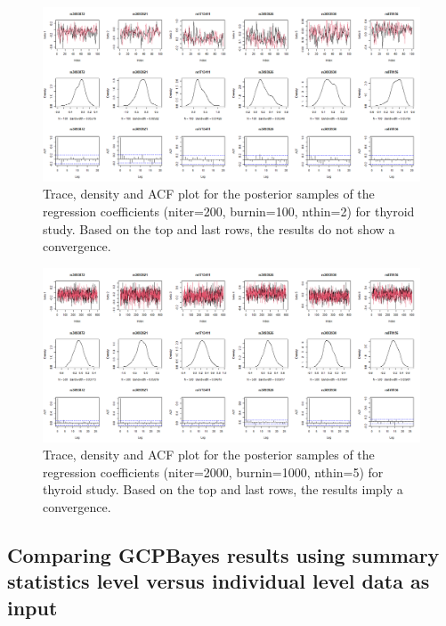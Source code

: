 \begin{figure}
\includegraphics[width=1\linewidth,height=0.3\textheight]{p1} \caption{Trace, density and ACF plot  for the posterior samples of the regression coefficients (niter=200, burnin=100, nthin=2) for thyroid study. Based on the top and last rows, the results do not show a convergence.}\label{fig:unnamed-chunk-23}
\end{figure}

\begin{figure}
\includegraphics[width=1\linewidth,height=0.3\textheight]{p2} \caption{Trace, density and ACF plot  for the posterior samples of the regression coefficients (niter=2000, burnin=1000, nthin=5) for thyroid study. Based on the top and last rows, the results imply a convergence.}\label{fig:unnamed-chunk-24}
\end{figure}

\hypertarget{comparing-gcpbayes-results-using-summary-statistics-level-versus-individual-level-data-as-input}{%
\subsection{Comparing GCPBayes results using summary statistics level versus individual level data as input}\label{comparing-gcpbayes-results-using-summary-statistics-level-versus-individual-level-data-as-input}}

